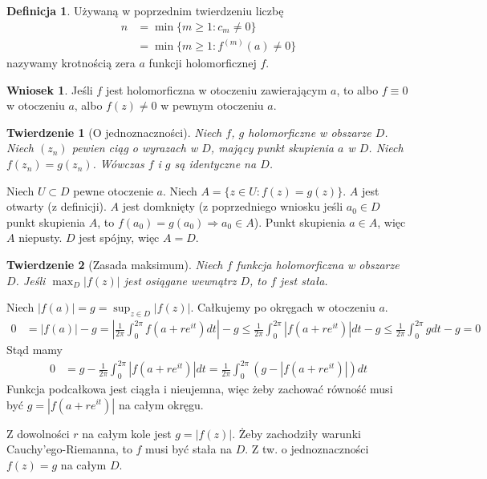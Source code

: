 \documentclass[11pt]{article}
\newcommand{\abs}[1]{\left|#1\right|} %
\theoremstyle{plain}
\newtheorem*{theorem}{Twierdzenie}
\theoremstyle{definition}
\newtheorem*{definition}{Definicja}
\newtheorem*{corollary}{Wniosek}
\theoremstyle{remark}
\let\oldendproof\endproof
\renewenvironment{proof}[1][\proofname]{
  \oldproof[\textsc{\small #1}]
}{\oldendproof}
\begin{document}
\begin{definition}
  Używaną w poprzednim twierdzeniu liczbę
  \begin{align*}
    n &
    = \min \{m \geq 1: c_m \neq 0\} \\ &
    = \min \{m \geq 1: f^{(m)}(a) \neq 0\}
  \end{align*}
  nazywamy krotnością zera $ a $ funkcji holomorficznej $ f $.
\end{definition}

\begin{corollary}
  Jeśli $ f $ jest holomorficzna w otoczeniu zawierającym $ a $, to
  albo $ f \equiv 0 $ w otoczeniu $ a $,
  albo $ f(z) \neq 0 $ w pewnym otoczeniu $ a $.
\end{corollary}


\begin{theorem}[O jednoznaczności]
  Niech $f$, $g$ holomorficzne w obszarze $D$.
  Niech $(z_n)$ pewien ciąg o wyrazach w $D$, mający punkt skupienia $a$ w $D$.
  Niech $ f(z_n) = g(z_n) $.
  Wówczas $f$ i $g$ są identyczne na $D$.
\end{theorem}

\begin{proof}
  Niech $ U \subset D $ pewne otoczenie $ a $.
  Niech $ A = \{ z \in U: f(z) = g(z) \} $.
  $ A $ jest otwarty (z definicji). %
  $ A $ jest domknięty (z poprzedniego wniosku jeśli $ a_0 \in D $ punkt skupienia $ A $, to $ f(a_0) = g(a_0) \Rightarrow a_0 \in A $).
  Punkt skupienia $ a \in A $, więc $ A $ niepusty.
  $ D $ jest spójny, więc $ A = D $.
\end{proof}

\begin{theorem}[Zasada maksimum]
  Niech $ f $ funkcja holomorficzna w obszarze $ D $.
  Jeśli $ \max_D \abs{f(z)} $ jest osiągane wewnątrz $ D $, to $ f $ jest stała.
\end{theorem}

\begin{proof}
  Niech $ \abs{f(a)} = g = \sup_{z \in D} \abs{f(z)} $. Całkujemy po okręgach w otoczeniu $ a $.
  \begin{align*}
    0 &
    = \abs{f(a)} - g
    = \abs{ \frac{1}{2 \pi} \int_{0}^{2 \pi} f(a + re^{it}) dt } - g
    \leq \frac{1}{2 \pi} \int_{0}^{2 \pi} \abs{f(a + re^{it})} dt - g
    \leq \frac{1}{2 \pi} \int_{0}^{2 \pi} g dt - g = 0
  \end{align*}
  Stąd mamy
  \begin{align*}
    0 &
    = g - \frac{1}{2 \pi} \int_{0}^{2 \pi} \abs{f(a + re^{it})} dt
    = \frac{1}{2 \pi} \int_{0}^{2 \pi} (g - \abs{f(a + re^{it})}) dt
  \end{align*}
  Funkcja podcałkowa jest ciągła i nieujemna, więc żeby zachować równość musi być $ g = \abs{f(a +re^{it})} $ na całym okręgu.

  Z dowolności $ r $ na całym kole jest $ g = \abs{f(z)} $.
  Żeby zachodziły warunki Cauchy’ego-Riemanna, to $ f $ musi być stała na $ D $.
  Z tw. o jednoznaczności $ f(z) = g $ na całym $ D $.
\end{proof}
\end{document}
